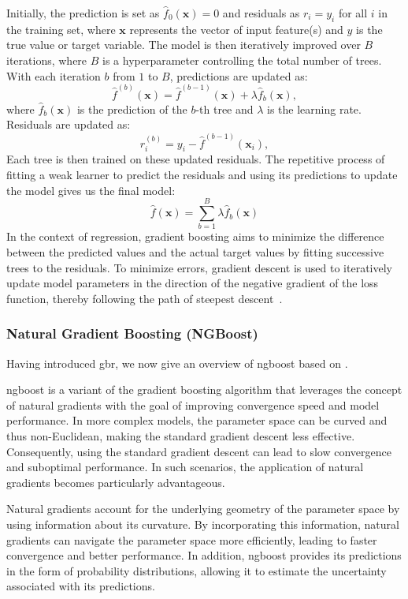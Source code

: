 Initially, the prediction is set as $\hat{f}_0(\mathbf{x}) = 0$ and residuals as $r_i = y_i$ for all $i$ in the training set, where $\mathbf{x}$ represents the vector of input feature(s) and $y$ is the true value or target variable.
The model is then iteratively improved over $B$ iterations, where $B$ is a hyperparameter controlling the total number of trees.
With each iteration $b$ from $1$ to $B$, predictions are updated as:
$$
    \hat{f}^{(b)}(\mathbf{x}) = \hat{f}^{(b-1)}(\mathbf{x}) + \lambda \hat{f}_b(\mathbf{x}),
$$
where $\hat{f}_b(\mathbf{x})$ is the prediction of the $b$-th tree and $\lambda$ is the learning rate. Residuals are updated as:
$$
    r_i^{(b)} = y_i - \hat{f}^{(b-1)}(\mathbf{x}_i),
$$
Each tree is then trained on these updated residuals.
The repetitive process of fitting a weak learner to predict the residuals and using its predictions to update the model gives us the final model:
$$
    \hat{f}(\mathbf{x}) = \sum_{b=1}^{B} \lambda \hat{f}_b(\mathbf{x})
$$
In the context of regression, gradient boosting aims to minimize the difference between the predicted values and the actual target values by fitting successive trees to the residuals.
To minimize errors, gradient descent is used to iteratively update model parameters in the direction of the negative gradient of the loss function, thereby following the path of steepest descent~\cite{gradientLossFunction}.

\subsubsection{Natural Gradient Boosting (NGBoost)}
Having introduced \gls{gbr}, we now give an overview of \gls{ngboost} based on \citet{duan_ngboost_2020}.

\gls{ngboost} is a variant of the gradient boosting algorithm that leverages the concept of natural gradients with the goal of improving convergence speed and model performance.
In more complex models, the parameter space can be curved and thus non-Euclidean, making the standard gradient descent less effective.
Consequently, using the standard gradient descent can lead to slow convergence and suboptimal performance.
In such scenarios, the application of natural gradients becomes particularly advantageous.

Natural gradients account for the underlying geometry of the parameter space by using information about its curvature.
By incorporating this information, natural gradients can navigate the parameter space more efficiently, leading to faster convergence and better performance.
In addition, \gls{ngboost} provides its predictions in the form of probability distributions, allowing it to estimate the uncertainty associated with its predictions.

